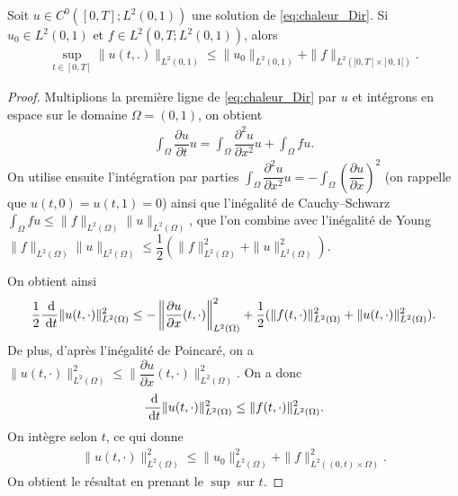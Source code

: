 \documentclass[12pt,a4paper,twoside]{article}
\begin{document}
\begin{proposition}
  \label{prop:chaleur_continuite_donnees}
  Soit $u \in C^0([0,T];L^2(0,1))$ une solution de \eqref{eq:chaleur_Dir}.
  Si $u_0 \in L^2(0,1)$ et $f \in L^2(0,T; L^2(0,1))$,
  alors 
  \begin{align*}
    \sup_{t \in [0,T]} \| u(t,.) \|_{L^2(0,1)} \leq \| u_0 \|_{L^2(0,1)} + \| f \|_{L^2(]0,T[ \times ]0,1[)} .
  \end{align*}
\end{proposition}

\begin{proof}
  Multiplions la premi\`ere ligne de \eqref{eq:chaleur_Dir} par $u$
  et int\'egrons en espace sur le domaine $\Omega = (0,1)$,
  on obtient
  \begin{align*}
    \int_{\Omega} \dfrac{\partial u}{\partial t} u = \int_{\Omega} \dfrac{\partial^2 u}{\partial x^2} u 
    + \int_{\Omega} f u .
  \end{align*}
  On utilise ensuite l'int\'egration par parties 
  $\int_{\Omega} \dfrac{\partial^2 u}{\partial x^2} u  
  = - \int_{\Omega} \left(\dfrac{\partial u}{\partial x} \right)^2$
  (on rappelle que $u(t,0) = u(t,1) = 0$)
  ainsi que l'in\'egalit\'e de Cauchy--Schwarz 
  $\int_{\Omega} f u \leq \| f \|_{L^2(\Omega)} \| u \|_{L^2(\Omega)}$,
  que l'on combine avec l'in\'egalit\'e de Young 
  $\| f \|_{L^2(\Omega)} \| u \|_{L^2(\Omega)} \leq \dfrac{1}{2} (\| f \|_{L^2(\Omega)}^2 +  \| u \|_{L^2(\Omega)}^2)$.
  
  On obtient ainsi
  \begin{align*}
    \dfrac{1}{2} \dfrac{\;\mathrm{d}}{\;\mathrm{d} t} \| u(t,\cdot) \|_{L^2(\Omega)}^2
    \leq - \left\| \dfrac{\partial u}{\partial x} (t,\cdot) \right\|_{L^2(\Omega)}^2
    + \dfrac{1}{2}  (\| f (t,\cdot) \|_{L^2(\Omega)}^2 +  \| u (t,\cdot) \|_{L^2(\Omega)}^2) .
  \end{align*}
  De plus, d'apr\`es l'in\'egalit\'e de Poincar\'e, on a 
  $\| u (t,\cdot) \|_{L^2(\Omega)}^2 \leq \| \dfrac{\partial u}{\partial x} (t,\cdot) \|_{L^2(\Omega)}^2$.
  On a donc 
  \begin{align*}
    \dfrac{\;\mathrm{d}}{\;\mathrm{d} t} \| u(t,\cdot) \|_{L^2(\Omega)}^2 \leq \| f (t,\cdot) \|_{L^2(\Omega)}^2 .
  \end{align*}
  On int\`egre selon $t$, ce qui donne
  \begin{align*}
    \| u(t,\cdot) \|_{L^2(\Omega)}^2 \leq \| u_0 \|_{L^2(\Omega)}^2 + \| f \|_{L^2((0,t) \times \Omega)}^2 .
  \end{align*}
  On obtient le r\'esultat en prenant le $\sup$ sur $t$.
\end{proof}
\end{document}

